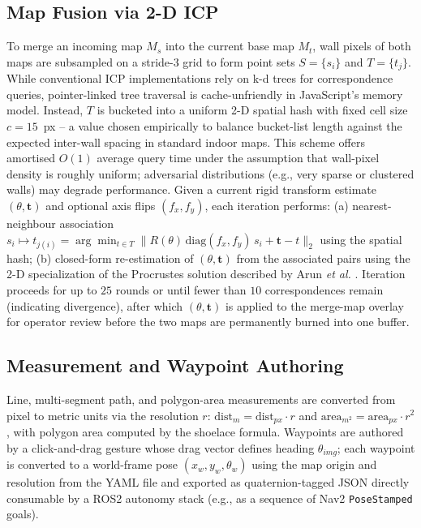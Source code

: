 \documentclass[journal]{IEEEtran}
\begin{document}
\subsection{Map Fusion via 2-D ICP}
To merge an incoming map $M_s$ into the current base map $M_t$, wall pixels of both maps are subsampled on a stride-3 grid to form point sets $S=\{s_i\}$ and $T=\{t_j\}$. While conventional ICP \cite{besl1992method} implementations rely on k-d trees for correspondence queries, pointer-linked tree traversal is cache-unfriendly in JavaScript's memory model. Instead, $T$ is bucketed into a uniform 2-D spatial hash with fixed cell size $c=15$~px -- a value chosen empirically to balance bucket-list length against the expected inter-wall spacing in standard indoor maps. This scheme offers amortised $O(1)$ average query time under the assumption that wall-pixel density is roughly uniform; adversarial distributions (e.g., very sparse or clustered walls) may degrade performance. Given a current rigid transform estimate $(\theta, \mathbf{t})$ and optional axis flips $(f_x,f_y)$, each iteration performs: (a) nearest-neighbour association $s_i \mapsto t_{j(i)} = \arg\min_{t\in T} \lVert R(\theta)\,\mathrm{diag}(f_x,f_y)\,s_i + \mathbf{t} - t\rVert_2$ using the spatial hash; (b) closed-form re-estimation of $(\theta,\mathbf{t})$ from the associated pairs using the 2-D specialization of the Procrustes solution described by Arun \emph{et al.} \cite{arun1987least}. Iteration proceeds for up to $25$ rounds or until fewer than $10$ correspondences remain (indicating divergence), after which $(\theta,\mathbf{t})$ is applied to the merge-map overlay for operator review before the two maps are permanently burned into one buffer.

\subsection{Measurement and Waypoint Authoring}
Line, multi-segment path, and polygon-area measurements are converted from pixel to metric units via the resolution $r$: $\text{dist}_m = \text{dist}_{px}\cdot r$ and $\text{area}_{m^2} = \text{area}_{px}\cdot r^2$, with polygon area computed by the shoelace formula. Waypoints are authored by a click-and-drag gesture whose drag vector defines heading $\theta_{img}$; each waypoint is converted to a world-frame pose $(x_w, y_w, \theta_w)$ using the map origin and resolution from the YAML file and exported as quaternion-tagged JSON directly consumable by a ROS2 autonomy stack (e.g., as a sequence of Nav2 \texttt{PoseStamped} goals).
\end{document}
